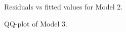 \documentclass[review,12pt,authoryear]{elsarticle}
\begin{document}
\begin{linenumbers}
\begin{figure}
  \caption{Residuals vs fitted values for Model 2.}
\end{figure}

\begin{figure}
  \caption{QQ-plot of Model 3.}
\end{figure}


\end{linenumbers}
\end{document}
